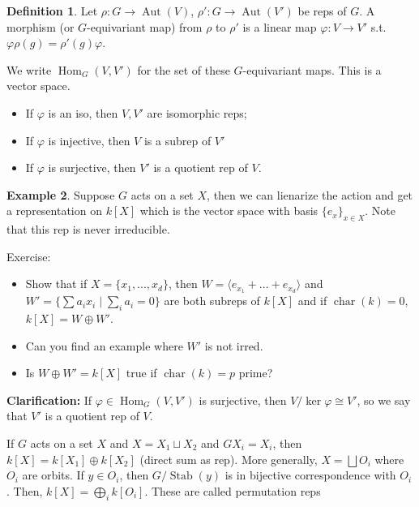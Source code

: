 \documentclass{article}
\theoremstyle{definition}
\newtheorem{defn}{Definition}[section]
\newtheorem{example}[defn]{Example}
\theoremstyle{remark}
\theoremstyle{plain}
\begin{document}
 \begin{defn}
     Let $\rho:G\to\operatorname{Aut}(V)$, $\rho':G\to\operatorname{Aut}(V')$ be reps of $G$. A morphism (or $G$-equivariant map) from $\rho$ to $\rho'$ is a linear map $\varphi:V\to V'$ s.t. $\varphi\rho(g)=\rho'(g)\varphi$.

     We write $\operatorname{Hom}_G(V,V')$ for the set of these $G$-equivariant maps. This is a vector space.
     \begin{itemize}
         \item If $\varphi$ is an iso, then $V,V'$ are isomorphic reps;
         \item If $\varphi$ is injective, then $V$ is a subrep of $V'$
         \item If $\varphi$ is surjective, then $V'$ is a quotient rep of $V$.
     \end{itemize}
 \end{defn}
 \begin{example}
     Suppose $G$ acts on a set $X$, then we can lienarize the action and get a representation on $k[X]$ which is the vector space with basis $\{e_x\}_{x\in X}$. Note that this rep is never irreducible.

     Exercise:
     \begin{itemize}
         \item Show that if $X=\{x_1,...,x_d\}$, then $W=\langle e_{x_1}+...+e_{x_d}\rangle$ and $W'=\{\sum a_ix_i\mid \sum_ia_i=0\}$ are both subreps of $k[X]$ and if $\operatorname{char}(k)=0$, $k[X]=W\oplus W'$.
         \item Can you find an example where $W'$ is not irred.
         \item Is $W\oplus W'=k[X]$ true if $\operatorname{char}(k)=p$ prime?
     \end{itemize}
 \end{example}

\textbf{Clarification:} If $\varphi\in\operatorname{Hom}_G(V,V')$ is surjective, then $V/\ker\varphi\cong V'$, so we say that $V'$ is a quotient rep of $V$.

If $G$ acts on a set $X$ and $X=X_1\sqcup X_2$ and $GX_i=X_i$, then $k[X]=k[X_1]\oplus k[X_2]$ (direct sum as rep). More generally, $X=\bigsqcup O_i$ where $O_i$ are orbits. If $y\in O_i$, then $G/\operatorname{Stab}(y)$ is in bijective correspondence with $O_i$. Then, $k[X]=\bigoplus_i k[O_i]$. These are called permutation reps
\end{document}
